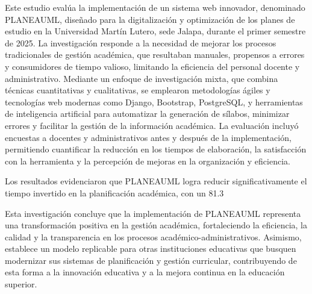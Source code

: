 

Este estudio evalúa la implementación de un sistema web innovador, denominado PLANEAUML, diseñado para la digitalización y optimización de los planes de estudio en la Universidad Martín Lutero, sede Jalapa, durante el primer semestre de 2025. La investigación responde a la necesidad de mejorar los procesos tradicionales de gestión académica, que resultaban manuales, propensos a errores y consumidores de tiempo valioso, limitando la eficiencia del personal docente y administrativo.
Mediante un enfoque de investigación mixta, que combina técnicas cuantitativas y cualitativas, se emplearon metodologías ágiles y tecnologías web modernas como Django, Bootstrap, PostgreSQL, y herramientas de inteligencia artificial para automatizar la generación de sílabos, minimizar errores y facilitar la gestión de la información académica. La evaluación incluyó encuestas a docentes y administrativos antes y después de la implementación, permitiendo cuantificar la reducción en los tiempos de elaboración, la satisfacción con la herramienta y la percepción de mejoras en la organización y eficiencia.

Los resultados evidenciaron que PLANEAUML logra reducir significativamente el tiempo invertido en la planificación académica, con un 81.3%

Esta investigación concluye que la implementación de PLANEAUML representa una transformación positiva en la gestión académica, fortaleciendo la eficiencia, la calidad y la transparencia en los procesos académico-administrativos. Asimismo, establece un modelo replicable para otras instituciones educativas que busquen modernizar sus sistemas de planificación y gestión curricular, contribuyendo de esta forma a la innovación educativa y a la mejora continua en la educación superior.
